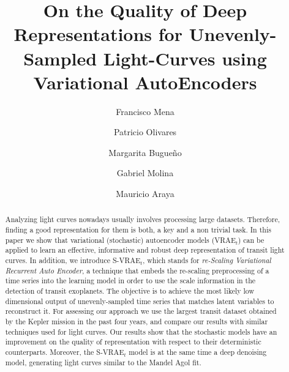 \documentclass[review]{elsarticle}
\begin{document}
\begin{frontmatter}

\title{On the Quality of Deep Representations for Unevenly-Sampled Light-Curves using Variational AutoEncoders}


\author[UTFSM_SJ]{Francisco Mena}

\author[UTFSM_CC]{Patricio Olivares}

\author[UTFSM_SJ]{Margarita Bugue\~no}

\author[UTFSM_SJ]{Gabriel Molina}

\author[UTFSM_CC]{Mauricio Araya}


\address[UTFSM_SJ]{Depto. Inform\'atica, Universidad T\'ecnica Federico Santa Mar\'ia, Santiago, Chile}
\address[UTFSM_CC]{Depto. Electr\'onica, Universidad T\'ecnica Federico Santa Mar\'ia, Valpara\'iso, Chile}


\begin{abstract} %
 Analyzing light curves nowadays usually involves processing large datasets. Therefore, finding a good representation for them is both, a key and a non trivial task. In this paper we show that variational (stochastic) autoencoder models (VRAE$_t$) can be applied to learn an effective, informative and robust deep representation of transit light curves.
In addition, we introduce S-VRAE$_t$, which stands for \textit{re-Scaling Variational Recurrent Auto Encoder}, a technique that embeds the re-scaling preprocessing of a time series into the learning model in order to use the scale information in the detection of transit exoplanets.
The objective is to achieve the most likely low dimensional output of unevenly-sampled time series that matches latent variables to reconstruct it.
For assessing our approach we use the largest transit dataset obtained by the Kepler mission in the past four years, and compare our results with similar techniques used for light curves. 
Our results show that the stochastic models have an improvement on the quality of representation with respect to their deterministic counterparts. Moreover, the S-VRAE$_t$ model is at the same time a deep denoising model, generating light curves similar to the Mandel Agol fit.
\end{abstract}


\end{frontmatter}
\end{document}
